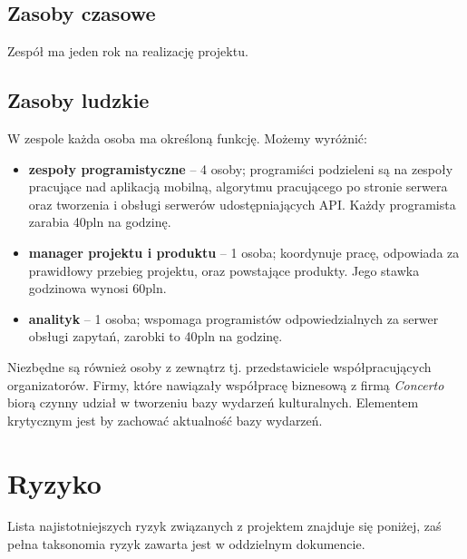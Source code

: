 \documentclass[10pt]{dokument-ppi}
\begin{document}
\subsection{Zasoby czasowe}
Zespół ma jeden rok na realizację projektu.

\subsection{Zasoby ludzkie}
W zespole każda osoba ma określoną funkcję. Możemy wyróżnić:
\begin{itemize}
    \item \textbf{zespoły programistyczne} -- 4 osoby; programiści podzieleni są
        na zespoły pracujące nad aplikacją mobilną, algorytmu pracującego po
        stronie serwera oraz tworzenia i obsługi serwerów udostępniających API.
        Każdy programista zarabia 40pln na godzinę.
    \item \textbf{manager projektu i produktu} -- 1 osoba; koordynuje pracę,
        odpowiada za prawidłowy przebieg projektu, oraz powstające produkty.
        Jego stawka godzinowa wynosi 60pln.
    \item \textbf{analityk} -- 1 osoba; wspomaga programistów odpowiedzialnych za serwer
        obsługi zapytań, zarobki to 40pln na godzinę.
\end{itemize}
Niezbędne są również osoby z zewnątrz tj. przedstawiciele współpracujących
organizatorów. Firmy, które nawiązały współpracę biznesową z firmą
\emph{Concerto} biorą czynny udział w tworzeniu bazy wydarzeń kulturalnych.
Elementem krytycznym jest by zachować aktualność bazy wydarzeń.


\section{Ryzyko}
Lista najistotniejszych ryzyk związanych z projektem znajduje się poniżej, zaś
pełna taksonomia ryzyk zawarta jest w oddzielnym dokumencie.
\end{document}
